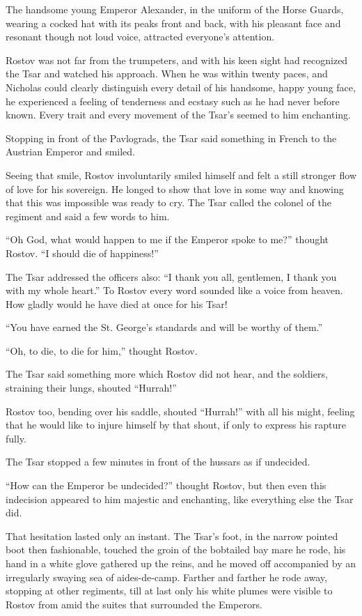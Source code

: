 The handsome young Emperor Alexander, in the uniform of the Horse
Guards, wearing a cocked hat with its peaks front and back, with
his pleasant face and resonant though not loud voice, attracted
everyone's attention.

Rostov was not far from the trumpeters, and with his keen sight
had recognized the Tsar and watched his approach. When he was
within twenty paces, and Nicholas could clearly distinguish every
detail of his handsome, happy young face, he experienced a
feeling of tenderness and ecstasy such as he had never before
known. Every trait and every movement of the Tsar's seemed to him
enchanting.

Stopping in front of the Pavlograds, the Tsar said something in
French to the Austrian Emperor and smiled.

Seeing that smile, Rostov involuntarily smiled himself and felt a
still stronger flow of love for his sovereign. He longed to show
that love in some way and knowing that this was impossible was
ready to cry. The Tsar called the colonel of the regiment and
said a few words to him.

``Oh God, what would happen to me if the Emperor spoke to me?''
thought Rostov. ``I should die of happiness!''

The Tsar addressed the officers also: ``I thank you all,
gentlemen, I thank you with my whole heart.'' To Rostov every
word sounded like a voice from heaven. How gladly would he have
died at once for his Tsar!

``You have earned the St. George's standards and will be worthy
of them.''

``Oh, to die, to die for him,'' thought Rostov.

The Tsar said something more which Rostov did not hear, and the
soldiers, straining their lungs, shouted ``Hurrah!''

Rostov too, bending over his saddle, shouted ``Hurrah!'' with all
his might, feeling that he would like to injure himself by that
shout, if only to express his rapture fully.

The Tsar stopped a few minutes in front of the hussars as if
undecided.

``How can the Emperor be undecided?'' thought Rostov, but then
even this indecision appeared to him majestic and enchanting,
like everything else the Tsar did.

That hesitation lasted only an instant. The Tsar's foot, in the
narrow pointed boot then fashionable, touched the groin of the
bobtailed bay mare he rode, his hand in a white glove gathered up
the reins, and he moved off accompanied by an irregularly swaying
sea of aides-de-camp.  Farther and farther he rode away, stopping
at other regiments, till at last only his white plumes were
visible to Rostov from amid the suites that surrounded the
Emperors.

